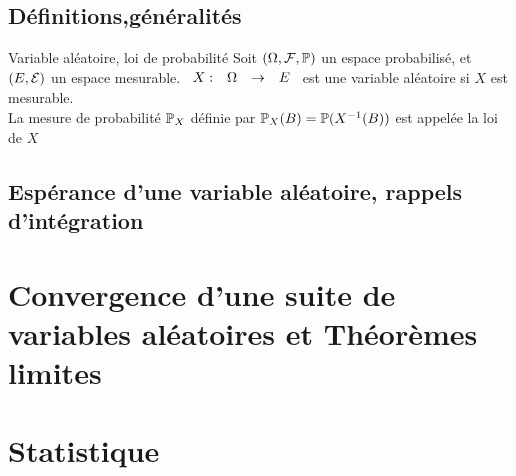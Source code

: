\documentclass[]{report}
\begin{document}
\section{Définitions,généralités}

\begin{df}{Variable aléatoire, loi de probabilité}{}
    Soit $(\Omega,\mathcal{F},\mathbb{P})$ un espace probabilisé, et $(E,\mathcal{E})$ un espace mesurable. $\begin{array}{ccccc} X : & \Omega & \to & E \end{array}$ est une variable aléatoire si $X$ est mesurable.\\
    La mesure de probabilité $\mathbb{P}_X$ définie par $\mathbb{P}_X(B)=\mathbb{P}(X^{-1}(B))$ est appelée la loi de $X$
\end{df}

\section{Espérance d'une variable aléatoire, rappels d'intégration}

\chapter{Convergence d'une suite de variables aléatoires et Théorèmes limites}

\chapter{Statistique}
\end{document}
